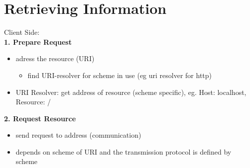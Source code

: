 \documentclass[11pt]{article}
\begin{document}
\section{Retrieving Information}
\label{sec:org34f9dae}
Client Side:\\
\textbf{1. Prepare Request}
\begin{itemize}
\item adress the resource (URI)
\begin{itemize}
\item find URI-resolver for scheme in use (eg uri resolver for http)
\end{itemize}
\item URI Resolver: get address of resource (scheme specific), eg. Host: localhost, Resource: /\\
\end{itemize}
\textbf{2. Request Resource}
\begin{itemize}
\item send request to address (communication)
\item depends on scheme of URI and the transmission protocol is defined by scheme
\end{itemize}
\end{document}
